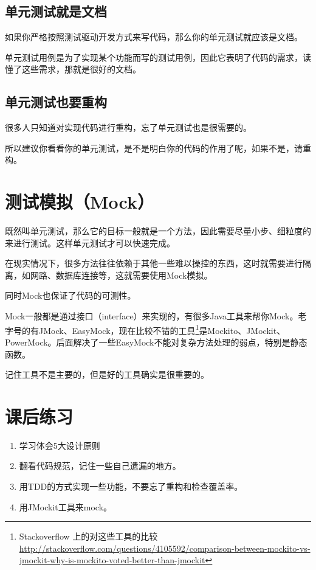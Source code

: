 \subsection{单元测试就是文档}
\label{单元测试就是文档}

如果你严格按照测试驱动开发方式来写代码，那么你的单元测试就应该是文档。

单元测试用例是为了实现某个功能而写的测试用例，因此它表明了代码的需求，读懂了这些需求，那就是很好的文档。

\subsection{单元测试也要重构}
\label{单元测试也要重构}

很多人只知道对实现代码进行重构，忘了单元测试也是很需要的。

所以建议你看看你的单元测试，是不是明白你的代码的作用了呢，如果不是，请重构。

\section{测试模拟（Mock）}
\label{测试模拟（mock）}

既然叫单元测试，那么它的目标一般就是一个方法，因此需要尽量小步、细粒度的来进行测试。这样单元测试才可以快速完成。

在现实情况下，很多方法往往依赖于其他一些难以操控的东西，这时就需要进行隔离，如网路、数据库连接等，这就需要使用Mock模拟。

同时Mock也保证了代码的可测性。

Mock一般都是通过接口（interface）来实现的，有很多Java工具来帮你Mock。老字号的有JMock、EasyMock，现在比较不错的工具\footnote{Stackoverflow 上的对这些工具的比较 \href{http://stackoverflow.com/questions/4105592/comparison-between-mockito-vs-jmockit-why-is-mockito-voted-better-than-jmockit}{http:/\slash stackoverflow.com\slash questions\slash 4105592\slash comparison-between-mockito-vs-jmockit-why-is-mockito-voted-better-than-jmockit}}是Mockito、JMockit、PowerMock。后面解决了一些EasyMock不能对复杂方法处理的弱点，特别是静态函数。

记住工具不是主要的，但是好的工具确实是很重要的。

\section{课后练习}
\label{课后练习}

\begin{enumerate}
\item 学习体会5大设计原则

\item 翻看代码规范，记住一些自己遗漏的地方。

\item 用TDD的方式实现一些功能，不要忘了重构和检查覆盖率。

\item 用JMockit工具来mock。

\end{enumerate}

